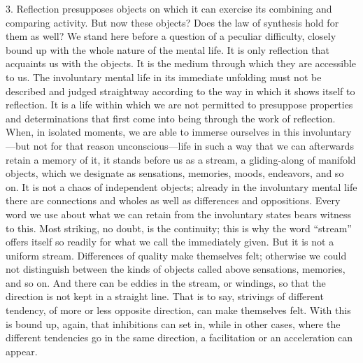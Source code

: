 \documentclass[12pt,a4paper]{book}
\begin{document}
3. Reflection presupposes objects on which it can exercise its combining
and comparing activity. But now these objects? Does the law of synthesis
hold for them as well? We stand here before a question of a peculiar
difficulty, closely bound up with the whole nature of the mental life.
It is only reflection that acquaints us with the objects. It is the
medium through which they are accessible to us. The involuntary mental
life in its immediate unfolding must not be described and judged
straightway according to the way in which it shows itself to reflection.
It is a life within which we are not permitted to presuppose properties
and determinations that first come into being through the work of
reflection. When, in isolated moments, we are able to immerse ourselves
in this involuntary---but not for that reason unconscious---life in such
a way that we can afterwards retain a memory of it, it stands before us
as a stream, a gliding-along of manifold objects, which we designate as
sensations, memories, moods, endeavors, and so on. It is not a chaos of
independent objects; already in the involuntary mental life there are
connections and wholes as well as differences and oppositions. Every
word we use about what we can retain from the involuntary states bears
witness to this. Most striking, no doubt, is the continuity; this is why
the word ``stream'' offers itself so readily for what we call the
immediately given. But it is not a uniform stream. Differences of
quality make themselves felt; otherwise we could not distinguish between
the kinds of objects called above sensations, memories, and so on. And
there can be eddies in the stream, or windings, so that the direction is
not kept in a straight line. That is to say, strivings of different
tendency, of more or less opposite direction, can make themselves felt.
With this is bound up, again, that inhibitions can set in, while in
other cases, where the different tendencies go in the same direction, a
facilitation or an acceleration can appear.
\end{document}
